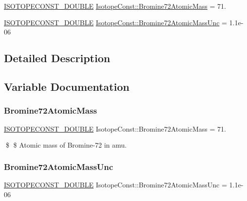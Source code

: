 \begin{DoxyCompactItemize}
\item 
\mbox{\hyperlink{group___isotope_const-_macros_ga8f45a7272ce02c0b4c65c44636ed719a}{I\+S\+O\+T\+O\+P\+E\+C\+O\+N\+S\+T\+\_\+\+D\+O\+U\+B\+LE}} \mbox{\hyperlink{group___isotope_const-_bromine-_br72_ga6dbc2997e0418148339eca132665f5f3}{Isotope\+Const\+::\+Bromine72\+Atomic\+Mass}} = 71.
\item 
\mbox{\hyperlink{group___isotope_const-_macros_ga8f45a7272ce02c0b4c65c44636ed719a}{I\+S\+O\+T\+O\+P\+E\+C\+O\+N\+S\+T\+\_\+\+D\+O\+U\+B\+LE}} \mbox{\hyperlink{group___isotope_const-_bromine-_br72_ga7d0de1052342b3786eb7146851a835fa}{Isotope\+Const\+::\+Bromine72\+Atomic\+Mass\+Unc}} = 1.\+1e-\/06
\end{DoxyCompactItemize}


\subsection{Detailed Description}


\subsection{Variable Documentation}
\mbox{\label{group___isotope_const-_bromine-_br72_ga6dbc2997e0418148339eca132665f5f3}} 
\subsubsection{\texorpdfstring{Bromine72\+Atomic\+Mass}{Bromine72AtomicMass}}
{\footnotesize\ttfamily \mbox{\hyperlink{group___isotope_const-_macros_ga8f45a7272ce02c0b4c65c44636ed719a}{I\+S\+O\+T\+O\+P\+E\+C\+O\+N\+S\+T\+\_\+\+D\+O\+U\+B\+LE}} Isotope\+Const\+::\+Bromine72\+Atomic\+Mass = 71.}

\$ \$ Atomic mass of Bromine-\/72 in amu. \mbox{\label{group___isotope_const-_bromine-_br72_ga7d0de1052342b3786eb7146851a835fa}} 
\subsubsection{\texorpdfstring{Bromine72\+Atomic\+Mass\+Unc}{Bromine72AtomicMassUnc}}
{\footnotesize\ttfamily \mbox{\hyperlink{group___isotope_const-_macros_ga8f45a7272ce02c0b4c65c44636ed719a}{I\+S\+O\+T\+O\+P\+E\+C\+O\+N\+S\+T\+\_\+\+D\+O\+U\+B\+LE}} Isotope\+Const\+::\+Bromine72\+Atomic\+Mass\+Unc = 1.\+1e-\/06}

